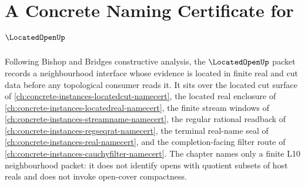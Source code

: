 \chapter{A Concrete Naming Certificate for $\LocatedOpenUp$}
\label{ch:concrete-instances-locatedopen-namecert}

Following Bishop and Bridges constructive analysis, the $\LocatedOpenUp$
packet records a neighbourhood interface whose evidence is located in finite
real and cut data before any topological consumer reads it. It sits over the
located cut surface of \autoref{ch:concrete-instances-locatedcut-namecert}, the
located real enclosure of \autoref{ch:concrete-instances-locatedreal-namecert},
the finite stream windows of \autoref{ch:concrete-instances-streamname-namecert},
the regular rational readback of
\autoref{ch:concrete-instances-regseqrat-namecert}, the terminal real-name seal
of \autoref{ch:concrete-instances-real-namecert}, and the completion-facing
filter route of \autoref{ch:concrete-instances-cauchyfilter-namecert}. The
chapter names only a finite L10 neighbourhood packet: it does not identify
opens with quotient subsets of host reals and does not invoke open-cover
compactness.


